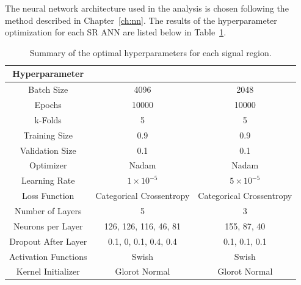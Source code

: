 The neural network architecture used in the \wh{} analysis is chosen following the method described in Chapter~\ref{ch:nn}. The results of the hyperparameter optimization for each SR ANN are listed below in Table~\ref{tab:vh_wh_architecture}.

\begin{table}[htp]
\centering
  \begin{tabular}{c|c|c}
    \hline
    \textbf{Hyperparameter} & \zdom{} & \zdep{} \\
    \hline
    \hline
    Batch Size & 4096 & 2048 \\
    Epochs & 10000 & 10000 \\
    k-Folds & 5 & 5 \\
    Training Size & 0.9 & 0.9 \\
    Validation Size & 0.1 & 0.1 \\
    Optimizer & Nadam & Nadam \\
    Learning Rate & $1 \times 10^{-5}$ & $5 \times 10^{-5}$ \\
    Loss Function & Categorical Crossentropy & Categorical Crossentropy \\
    Number of Layers & 5 & 3 \\
    Neurons per Layer & 126, 126, 116, 46, 81 & 155, 87, 40 \\
    Dropout After Layer & 0.1, 0, 0.1, 0.4, 0.4 & 0.1, 0.1, 0.1 \\
    Activation Functions & Swish & Swish \\
    Kernel Initializer & Glorot Normal & Glorot Normal \\
  \end{tabular}
  \caption{Summary of the optimal hyperparameters for each \wh{} signal region.}\label{tab:vh_wh_architecture}
\end{table}